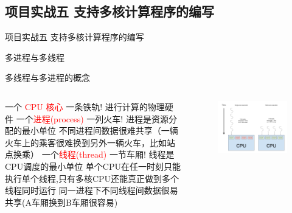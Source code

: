 \subsection{项目实战五 支持多核计算程序的编写}

\begin{frame}[standout] 项目实战五 \quad 支持多核计算程序的编写 \end{frame}

\begin{frame}[standout] 多进程与多线程 \end{frame}

\begin{frame}{多线程与多进程的概念}
    \begin{columns}
        \begin{myoutline}
            \1 一个 \textcolor{red}{CPU 核心}
                \2 一条铁轨!
                \2 进行计算的物理硬件
            \1 一个\textcolor{red}{进程(process)} 
                \2一列火车!
                \2 进程是资源分配的最小单位
                \2 不同进程间数据很难共享（一辆火车上的乘客很难换到另外一辆火车，比如站点换乘）
            \1 一个\textcolor{red}{线程(thread)}
                \2 一节车厢!
                \2 线程是CPU调度的最小单位
                \2 单个CPU在任一时刻只能执行单个线程,只有多核CPU还能真正做到多个线程同时运行
                \2 同一进程下不同线程间数据很易共享(A车厢换到B车厢很容易)
        \end{myoutline}
        \begin{figure}
            \centering
            \includegraphics[width=0.9\linewidth]{Images/core_cores.png}
        \end{figure}
    \end{columns}

    
\end{frame}

